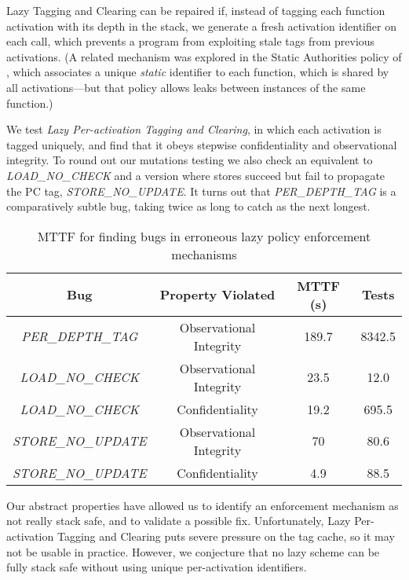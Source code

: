 \documentclass[acmsmall,review,anonymous]{acmart}\settopmatter{printfolios=true,printccs=false,printacmref=false}
\begin{document}
{{Lazy Tagging and Clearing can be repaired if, instead of tagging each function
activation with its depth in the stack, we generate a fresh activation
identifier on each call, which prevents a program from exploiting stale
tags from previous activations.
(A related mechanism was explored in the
Static Authorities policy of \citet{DBLP:conf/sp/RoesslerD18}, which
associates a unique \emph{static} identifier to each function, which is shared
by all activations---but that policy allows leaks between
instances of the same function.)

We test {\em Lazy Per-activation Tagging and Clearing}, in which
each activation is tagged uniquely, and find that it obeys stepwise
confidentiality and observational integrity. To round out our mutations testing
we also check an equivalent to {\em LOAD\_NO\_CHECK} and a version where
stores succeed but fail to propagate the PC tag, {\em STORE\_NO\_UPDATE}.
It turns out that {\em PER\_DEPTH\_TAG} is a comparatively subtle bug,
taking twice as long to catch as the next longest.

\begin{table}[]
\centering
\begin{tabular}{c|c|c|c}
        Bug & Property Violated & MTTF (s) & Tests \\
  \hline
        {\em PER\_DEPTH\_TAG} & Observational Integrity & 189.7 & 8342.5  \\
        {\em LOAD\_NO\_CHECK}  & Observational Integrity & 23.5 & 12.0 \\
        {\em LOAD\_NO\_CHECK}  & Confidentiality & 19.2 & 695.5 \\
        {\em STORE\_NO\_UPDATE} & Observational Integrity & 70 & 80.6  \\
        {\em STORE\_NO\_UPDATE} & Confidentiality & 4.9 & 88.5 \\
\end{tabular}
\vspace*{1em}
\caption{MTTF for finding bugs in erroneous lazy policy enforcement mechanisms}
\vspace*{-2em}
\label{tab:lazy-bug-table}
\end{table}


Our abstract properties have allowed us to identify an enforcement mechanism as
not really stack safe, and to validate a possible fix.
Unfortunately, Lazy Per-activation Tagging and Clearing
puts severe pressure on the tag cache, so it may not be usable in practice.
However, we conjecture that no lazy scheme can be fully stack safe
without using unique per-activation identifiers.

}}
\end{document}
